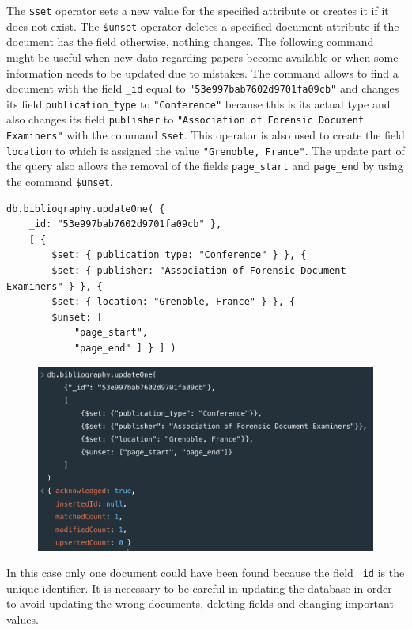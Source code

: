 \begin{enumerate}
    The \verb|$set| operator sets a new value for the specified attribute or creates it if it does not exist.
    The \verb|$unset| operator deletes a specified document attribute if the document has the field otherwise, nothing changes.
    The following command might be useful when new data regarding papers become available or when some information needs to be updated due to mistakes.
    The command allows to find a document with the field \verb|_id| equal to \verb|"53e997bab7602d9701fa09cb"| and changes its field \verb|publication_type| to \verb|"Conference"| because this is its actual type and also changes its field \verb|publisher| to \verb|"Association of Forensic Document Examiners"| with the command \verb|$set|.
    This operator is also used to create the field \verb|location| to which is assigned the value \verb|"Grenoble, France"|.
    The update part of the query also allows the removal of the fields \verb|page_start| and \verb|page_end| by using the command \verb|$unset|.
    \begin{lstlisting}[label={lst:lstlisting57}]
db.bibliography.updateOne( {
    _id: "53e997bab7602d9701fa09cb" },
    [ {
        $set: { publication_type: "Conference" } }, {
        $set: { publisher: "Association of Forensic Document Examiners" } }, {
        $set: { location: "Grenoble, France" } }, {
        $unset: [
            "page_start",
            "page_end" ] } ] )
    \end{lstlisting}
    \begin{figure}[H]
        \begin{center}
            \includegraphics[width=0.6\linewidth]{ImagesMongoDB/query2mongo}
            \label{fig:query2mongo}%
        \end{center}
    \end{figure}
    In this case only one document could have been found because the field \verb|_id| is the unique identifier.
    It is necessary to be careful in updating the database in order to avoid updating the wrong documents, deleting fields and changing important values.


\end{enumerate}
